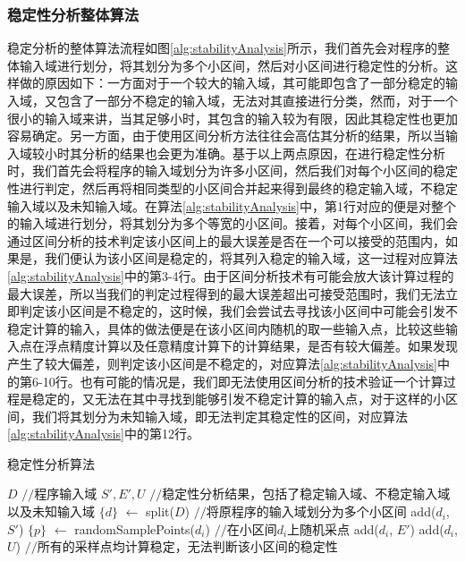 \subsubsection{稳定性分析整体算法}

稳定分析的整体算法流程如图\ref{alg:stabilityAnalysis}所示，我们首先会对程序的整体输入域进行划分，将其划分为多个小区间，然后对小区间进行稳定性的分析。这样做的原因如下：一方面对于一个较大的输入域，其可能即包含了一部分稳定的输入域，又包含了一部分不稳定的输入域，无法对其直接进行分类，然而，对于一个很小的输入域来讲，当其足够小时，其包含的输入较为有限，因此其稳定性也更加容易确定。另一方面，由于使用区间分析方法往往会高估其分析的结果，所以当输入域较小时其分析的结果也会更为准确。基于以上两点原因，在进行稳定性分析时，我们首先会将程序的输入域划分为许多小区间，然后我们对每个小区间的稳定性进行判定，然后再将相同类型的小区间合并起来得到最终的稳定输入域，不稳定输入域以及未知输入域。在算法\ref{alg:stabilityAnalysis}中，第1行对应的便是对整个的输入域进行划分，将其划分为多个等宽的小区间。接着，对每个小区间，我们会通过区间分析的技术判定该小区间上的最大误差是否在一个可以接受的范围内，如果是，我们便认为该小区间是稳定的，将其列入稳定的输入域，这一过程对应算法\ref{alg:stabilityAnalysis}中的第3-4行。由于区间分析技术有可能会放大该计算过程的最大误差，所以当我们的判定过程得到的最大误差超出可接受范围时，我们无法立即判定该小区间是不稳定的，这时候，我们会尝试去寻找该小区间中可能会引发不稳定计算的输入，具体的做法便是在该小区间内随机的取一些输入点，比较这些输入点在浮点精度计算以及任意精度计算下的计算结果，是否有较大偏差。如果发现产生了较大偏差，则判定该小区间是不稳定的，对应算法\ref{alg:stabilityAnalysis}中的第6-10行。也有可能的情况是，我们即无法使用区间分析的技术验证一个计算过程是稳定的，又无法在其中寻找到能够引发不稳定计算的输入点，对于这样的小区间，我们将其划分为未知输入域，即无法判定其稳定性的区间，对应算法\ref{alg:stabilityAnalysis}中的第12行。
\begin{algorithm}[thb]
  \caption{稳定性分析算法}
  \label{alg:stabilityAnalysis}
\begin{algorithmic}[1]
\REQUIRE $D$ {{\footnotesize$//$}\small 程序输入域}
\ENSURE $S', E', U$ {{\footnotesize$//$}\small 稳定性分析结果，包括了稳定输入域、不稳定输入域以及未知输入域}
\STATE $\{ d \}$ $\leftarrow$ split($D$) {{\footnotesize$//$}\small 将原程序的输入域划分为多个小区间}
\STATE add($d_i$, $S'$)
\ELSE
\STATE $\{ p \}$ $\leftarrow$ randomSamplePoints($d_i$) {{\footnotesize$//$}\small 在小区间$d_i$上随机采点}
\STATE add($d_i$, $E'$)
\ENDIF
\ENDFOR
\STATE add($d_i$,$U$) {{\footnotesize$//$}\small 所有的采样点均计算稳定，无法判断该小区间的稳定性}
\ENDIF
\ENDFOR
\end{algorithmic}
\end{algorithm}

